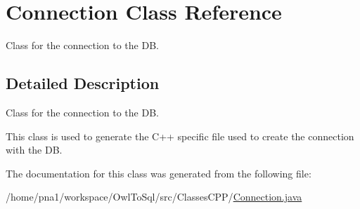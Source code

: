 \hypertarget{class_connection}{
\section{Connection Class Reference}
\label{class_connection}
}


Class for the connection to the DB.  




\subsection{Detailed Description}
Class for the connection to the DB. 

This class is used to generate the C++ specific file used to create the connection with the DB. 

The documentation for this class was generated from the following file:\begin{DoxyCompactItemize}
\item 
/home/pna1/workspace/OwlToSql/src/ClassesCPP/\hyperlink{_connection_8java}{Connection.java}\end{DoxyCompactItemize}
